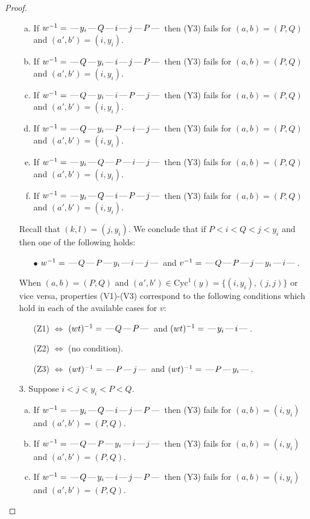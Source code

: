 \documentclass[10pt]{article}
\theoremstyle{definition}
\theoremstyle{definition}
\def\dash{\text{\hspace{0.5mm}---\hspace{0.5mm}}}
\def\Cyc{\mathrm{Cyc}}
\begin{document}
\begin{proof}
\begin{enumerate}
\begin{enumerate}[(a)]
\item If $w^{-1} = \dash y_i\dash Q\dash i\dash j\dash P\dash $ then (Y3) fails for $(a,b)=(P,Q)$ and $(a',b')=(i,y_i)$.
\item If $w^{-1} = \dash Q\dash y_i\dash i\dash j\dash P\dash $ then (Y3) fails for $(a,b)=(P,Q)$ and $(a',b')=(i,y_i)$.
\item If $w^{-1} = \dash Q\dash y_i\dash i\dash P\dash j\dash $ then (Y3) fails for $(a,b)=(P,Q)$ and $(a',b')=(i,y_i)$.
\item If $w^{-1} = \dash Q\dash y_i\dash P\dash i\dash j\dash $ then (Y3) fails for $(a,b)=(P,Q)$ and $(a',b')=(i,y_i)$.
\item If $w^{-1} = \dash y_i\dash Q\dash P\dash i\dash j\dash $ then (Y3) fails for $(a,b)=(P,Q)$ and $(a',b')=(i,y_i)$.
\item If $w^{-1} = \dash y_i\dash Q\dash i\dash P\dash j\dash $ then (Y3) fails for $(a,b)=(P,Q)$ and $(a',b')=(i,y_i)$.
\end{enumerate}
Recall that $(k,l) = (j,y_i)$.
We conclude that if $P < i < Q < j < y_i$ and then one of the following holds:
\begin{enumerate}
\item[$\bullet$] $w^{-1} = \dash Q\dash P\dash y_i\dash i\dash j\dash $ and $v^{-1} = \dash Q\dash P\dash j\dash y_i\dash i\dash $.
\end{enumerate}
When $(a,b)= (P,Q)$ and $(a',b')\in \Cyc^1(y)=\{(i,y_i),(j,j)\}$ or vice versa,
properties (V1)-(V3) correspond to the following conditions which hold in
each of the available cases for $v$:
\begin{enumerate}
\item[](Z1) $\Leftrightarrow$ $(wt)^{-1} = \dash Q \dash P \dash$  and $(wt)^{-1} = \dash y_i \dash i \dash$.
\item[](Z2) $\Leftrightarrow$ (no condition).
\item[](Z3) $\Leftrightarrow$ $(wt)^{-1} = \dash P \dash j \dash$  and $(wt)^{-1} = \dash P \dash y_i \dash$.
\end{enumerate}
\item[$3$.] Suppose $i < j < y_i < P < Q$.
\begin{enumerate}[(a)]
\item If $w^{-1} = \dash y_i\dash Q\dash i\dash j\dash P\dash $ then (Y3) fails for $(a,b)=(i,y_i)$ and $(a',b')=(P,Q)$.
\item If $w^{-1} = \dash Q\dash P\dash y_i\dash i\dash j\dash $ then (Y3) fails for $(a,b)=(i,y_i)$ and $(a',b')=(P,Q)$.
\item If $w^{-1} = \dash Q\dash y_i\dash i\dash j\dash P\dash $ then (Y3) fails for $(a,b)=(i,y_i)$ and $(a',b')=(P,Q)$.

\end{enumerate}
\end{enumerate}
\end{proof}
\end{document}
